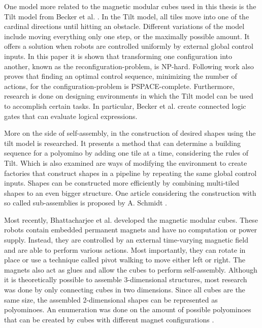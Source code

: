One model more related to the magnetic modular cubes used in this thesis is the Tilt model from Becker et al. \cite{Becker2014_SP}.
In the Tilt model, all tiles move into one of the cardinal directions until hitting an obstacle.
Different variations of the model include moving everything only one step, or the maximally possible amount.
It offers a solution when robots are controlled uniformly by external global control inputs.
In this paper it is shown that transforming one configuration into another, known as the reconfiguration-problem, is NP-hard.
Following work \cite{Becker2014} also proves that finding an optimal control sequence, minimizing the number of actions, for the configuration-problem is PSPACE-complete.
Furthermore, research is done on designing environments in which the Tilt model can be used to accomplish certain tasks.
In particular, Becker et al. \cite{Becker2014} create connected logic gates that can evaluate logical expressions.

More on the side of self-assembly, in \cite{Becker2020} the construction of desired shapes using the tilt model is researched.
It presents a method that can determine a building sequence for a polyomino by adding one tile at a time, considering the rules of Tilt.
Which is also examined are ways of modifying the environment to create factories that construct shapes in a pipeline by repeating the same global control inputs.
Shapes can be constructed more efficiently by combining multi-tiled shapes to an even bigger structure.
One article considering the construction with so called sub-assemblies is proposed by A. Schmidt \cite{Schmidt2018}.

Most recently, Bhattacharjee et al. \cite{Bhattacharjee2022} developed the magnetic modular cubes.
These robots contain embedded permanent magnets and have no computation or power supply.
Instead, they are controlled by an external time-varying magnetic field and are able to perform various actions.
Most importantly, they can rotate in place or use a technique called pivot walking to move either left or right.
The magnets also act as glues and allow the cubes to perform self-assembly.
Although it is theoretically possible to assemble 3-dimensional structures, most research was done by only connecting cubes in two dimensions.
Since all cubes are the same size, the assembled 2-dimensional shapes can be represented as polyominoes.
An enumeration was done on the amount of possible polyominoes that can be created by cubes with different magnet configurations \cite{Lu2021}.

